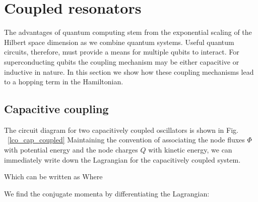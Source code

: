 \section{Coupled resonators}
The advantages of quantum computing stem from the exponential scaling of the Hilbert space dimension as we combine quantum systems.
Useful quantum circuits, therefore, must provide a means for multiple qubits to interact.
For superconducting qubits the coupling mechanism may be either capacitive or inductive in nature.
In this section we show how these coupling mechanisms lead to a hopping term in the Hamiltonian.

\subsection{Capacitive coupling}

The circuit diagram for two capacitively coupled oscillators is shown in Fig.\,~\ref{lco_cap_coupled}
Maintaining the convention of associating the node fluxes $\Phi$ with potential energy and the node charges $Q$ with kinetic energy,
we can immediately write down the Lagrangian for the capacitively coupled system.

Which can be written as
\noindent
Where

We find the conjugate momenta by differentiating the Lagrangian:

